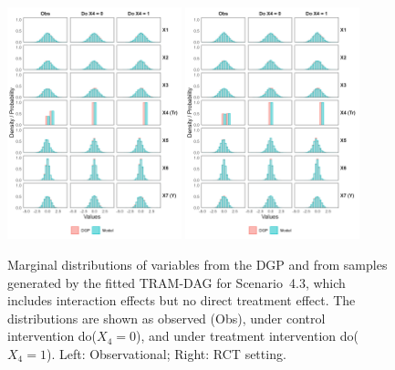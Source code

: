\begin{figure}[htbp]
\centering
\includegraphics[width=0.45\textwidth]{img/results/observ_scenario3_sampling_distributions_vertical.png}
\includegraphics[width=0.45\textwidth]{img/results/rct_scenario3_sampling_distributions_vertical.png}
\caption{Marginal distributions of variables from the DGP and from samples generated by the fitted TRAM-DAG for Scenario~4.3, which includes interaction effects but no direct treatment effect. The distributions are shown as observed (Obs), under control intervention do($X_4 = 0$), and under treatment intervention do($X_4 = 1$). Left: Observational; Right: RCT setting.}
\label{fig:scenario3_sampling_distributions_vertical}
\end{figure}



